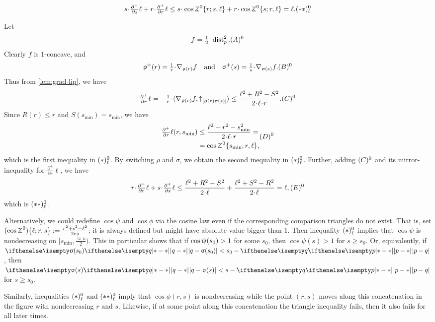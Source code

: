 \[
s\cdot\tfrac{\partial^+}{\partial s}\ell
+
r\cdot\tfrac{\partial^+}{\partial r}\ell\le 
 s\cdot\cos\tangle\mc0\{r;s,\ell\}
+
r\cdot\cos\tangle\mc0\{s;r,\ell\}=\ell.
\leqno(**)\mc0_\ell
\]

Let 
\[f=\tfrac{1}{2}\cdot\distfun[2]{p}{}{}.\leqno(A)\mc0\] 
Clearly $f$ is $1$-concave, and
\[\rho^+(r)=\tfrac{1}{r}\cdot\nabla_{\rho(r)} f\quad \text{and}\quad \sigma^+(s)=\tfrac{1}{s}\cdot\nabla_{\sigma(s)} f.\leqno(B)\mc0\]
Thus from \ref{lem:grad-lip}, we have
\[\tfrac{\partial^+}{\partial r}\ell
=
-\tfrac{1}{r}\cdot\<\nabla_{\rho(r)} f,\dir{\rho(r)}{\sigma(s)}\>
\le\frac{{\ell^2}+{R^2}-{S^2}}{2\cdot\ell\cdot r}.\leqno(C)\mc0\]
Since $R(r)\le r$ and $S(s_{\min})=s_{\min}$, we have
\[
\begin{aligned}
\tfrac{\partial^+}{\partial r}\ell(r,s_{\min})
&\le
\frac{{\ell^2}+r^2-s_{\min}^2}{2\cdot\ell\cdot r}
=\\
&=
\cos\tangle\mc0\{s_{\min};r,\ell\},
\end{aligned}
\leqno(D)\mc0
\]
which is the first inequality in $(*)^{0}_\ell$.
By switching $\rho$ and $\sigma$, we obtain the second inequality in $(*)^{0}_\ell$.
Further, adding $(C)^{0}$ and its mirror-inequality for $\frac{\partial^+}{\partial s}\ell$, we have
\[r\cdot\tfrac{\partial^+}{\partial r}\ell
+
s\cdot\tfrac{\partial^+}{\partial s}\ell
\le 
\frac{{\ell^2}+{R^2}-{S^2}}{2\cdot\ell }+\frac{{\ell^2}+{S^2}-{R^2}}{2\cdot\ell }
= 
\ell,
\leqno(E)\mc0\]
which is $(**)^{0}_\ell$.
\qeds

Alternatively, we could redefine $\cos \psi$ and $\cos \phi$ via 
the cosine law even if the corresponding comparison triangles do not exist.
That is, set $(\cos \tangle\mc0)\{\ell;r,s\}\df\frac{r^2+s^2-\ell^2}{2rs}$; it is 
always defined but might have absolute value bigger than 1. Then inequality $ 
(*)^{0}_\ell$ implies that $\cos \psi$ is nondecreasing  on $  
[s_{\min},\tfrac{\varpi\kappa}2)$.
This in particular shows that 
if  $\cos  \psi(s_0)\z>1$ for some $s_0$, then $\cos  \psi(s)>1$ for 
$s\ge s_0$.
Or, 
equivalently, if $\dist{q}{\sigma(s_0)}{}<s_0-\dist{p}{q}{}$, then
$\dist{q}{\sigma(s)}{}<s-\dist{p}{q}{}$ for $s\ge s_0$.

Similarly,  inequalities $ (*)^{0}_\ell$ and  $ (**)^{0}_\ell$ imply that  $\cos 
\phi(r, s)$ is nondecreasing while the  point $(r,s)$ moves along this 
concatenation in  the figure with nondecreasing $r$ and $s$.
Likewise, if at some point along this concatenation the triangle inequality fails, 
then it also fails for all later times.



